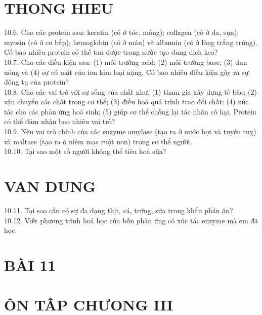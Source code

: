 \documentclass[10pt]{article}
\begin{document}
\section*{THONG HIEU}
10.6. Cho các protein sau: keratin (có ở tóc, móng); collagen (có ở da, sụn); myosin (có ở cơ bắp); hemoglobin (có ở máu) và albumin (có ở lòng trắng trứng). Có bao nhiêu protein có thể tan được trong nước tạo dung dịch keo?\\
10.7. Cho các điều kiện sau: (1) môi trường acid; (2) môi trường base; (3) đun nóng và (4) sự có mặt của ion kim loại nặng. Có bao nhiêu điều kiện gây ra sự đông tụ của protein?\\
10.8. Cho các vai trò với sự sống của chất như. (1) tham gia xây dựng tế bào; (2) vận chuyển các chất trong cơ thể; (3) điều hoà quá trình trao đổi chất; (4) xúc tác cho các phản ứng hoá sinh; (5) giúp cơ thể chống lại tác nhân có hại. Protein có thể đảm nhận bao nhiêu vai trò?\\
10.9. Nêu vai trò chính của các enzyme amylase (tạo ra ở nước bọt và tuyến tuỵ) và maltase (tạo ra ở niêm mạc ruột non) trong cơ thể người.\\
10.10. Tại sao một số người không thể tiêu hoá sữa?

\section*{VAN DUNG}
10.11. Tại sao cần có sự đa dạng thịt, cá, trứng, sữa trong khẩu phần ăn?\\
10.12. Viết phương trình hoá học của bốn phản ứng có xúc tác enzyme mà em đã học.

\section*{BÀI 11}
\section*{ÔN TÂP CHƯONG III}
\end{document}
